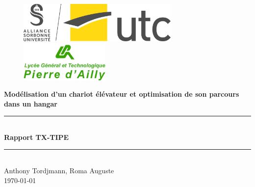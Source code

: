 \documentclass{report-UTC}
\begin{document}
\thispagestyle{empty}

\begin{figure}[h]
\centering
\includegraphics[height=2cm]{assets/logo_utc.jpg}
	\hspace{1cm}
\includegraphics[height=2cm]{assets/logo_dailly.png}
\end{figure}

\vspace{1.5cm}

\begin{center}
\huge{\textbf{Modélisation d'un chariot élévateur et optimisation de son parcours dans un hangar}} \\
\vspace{1cm}
\noindent\rule{10cm}{0.4pt} \\
\vspace{0.5cm}
\huge{\textbf{Rapport TX-TIPE}} \\
\vspace{0.5cm}
\noindent\rule{10cm}{0.4pt}  \\
\vspace{2cm}
\Large{Anthony Tordjmann, Roma Auguste} \\
\vspace{1.5cm}
\Large{\today}
\end{center}

\renewcommand*\contentsname{Sommaire}

\clearpage

\tableofcontents\thispagestyle{empty}

\clearpage

\clearpage

\clearpage
\printbibliography 
\end{document}
